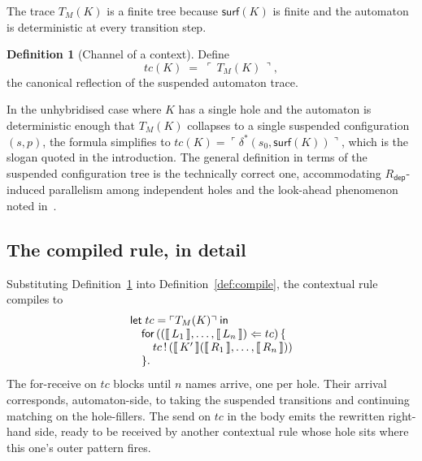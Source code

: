 \documentclass[11pt]{article}
\theoremstyle{plain}
\theoremstyle{definition}
\newtheorem{definition}[theorem]{Definition}
\theoremstyle{remark}
\newcommand{\sem}[1]{\llbracket\,#1\,\rrbracket}
\newcommand{\reflect}[1]{\ulcorner #1 \urcorner}
\newcommand{\rdep}{R_{\mathsf{dep}}}
\newcommand{\surface}{\mathsf{surf}}
\newcommand{\Send}[2]{#1 \,!\, (#2)}
\begin{document}
The trace $T_{M}(K)$ is a finite tree because $\surface(K)$ is finite and
the automaton is deterministic at every transition step.

\begin{definition}[Channel of a context]\label{def:channel}
Define
\[
  tc(K) \;=\; \reflect{\,T_{M}(K)\,},
\]
the canonical reflection of the suspended automaton trace.
\end{definition}

In the unhybridised case where $K$ has a single hole and the automaton is
deterministic enough that $T_{M}(K)$ collapses to a single suspended
configuration $(s, p)$, the formula simplifies to
$tc(K) = \reflect{\delta^{*}(s_{0}, \surface(K))}$, which is the slogan
quoted in the introduction. The general definition in terms of the
suspended configuration tree is the technically correct one, accommodating
$\rdep$-induced parallelism among independent holes and the look-ahead
phenomenon noted in~\cite[\S 1.1]{BouwmanErkens2022}.

\subsection{The compiled rule, in detail}

Substituting Definition~\ref{def:channel} into Definition~\ref{def:compile},
the contextual rule compiles to
\[
\begin{array}{@{}l@{}}
  \mathsf{let}\;tc = \reflect{T_{M}(K)}\;\mathsf{in} \\
  \quad \mathsf{for}\,((\sem{L_{1}}, \ldots, \sem{L_{n}}) \Leftarrow tc)\,\{ \\
  \quad\quad \Send{tc}{\sem{K'}(\sem{R_{1}}, \ldots, \sem{R_{n}})} \\
  \quad \}.
\end{array}
\]
The for-receive on $tc$ blocks until $n$ names arrive, one per hole. Their
arrival corresponds, automaton-side, to taking the suspended transitions
and continuing matching on the hole-fillers. The send on $tc$ in the body
emits the rewritten right-hand side, ready to be received by another
contextual rule whose hole sits where this one's outer pattern fires.
\end{document}
